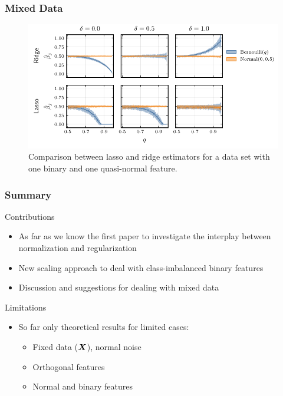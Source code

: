 \documentclass[10pt]{beamer}
\begin{document}
\begin{frame}[c]
  \frametitle{Mixed Data}

  \begin{figure}[htpb]
    \centering
    \includegraphics[width=\textwidth]{figures/paper6-mixed_data.pdf}
    \caption{%
      Comparison between lasso and ridge estimators for a data set with one binary and one quasi-normal feature.}
  \end{figure}
\end{frame}

\begin{frame}[c]
  \frametitle{Summary}
  \begin{exampleblock}{Contributions}
    \begin{itemize}
      \item As far as we know the first paper to investigate the interplay between normalization and
            regularization
      \item New scaling approach to deal with class-imbalanced binary features
      \item Discussion and suggestions for dealing with mixed data
    \end{itemize}
  \end{exampleblock}

  \pause

  \begin{alertblock}{Limitations}
    \begin{itemize}
      \item So far only theoretical results for limited cases:
            \begin{itemize}
              \item Fixed data (\(\bm{X}\)), normal noise
              \item Orthogonal features
              \item Normal and binary features
            \end{itemize}
    \end{itemize}
  \end{alertblock}
\end{frame}
\end{document}
